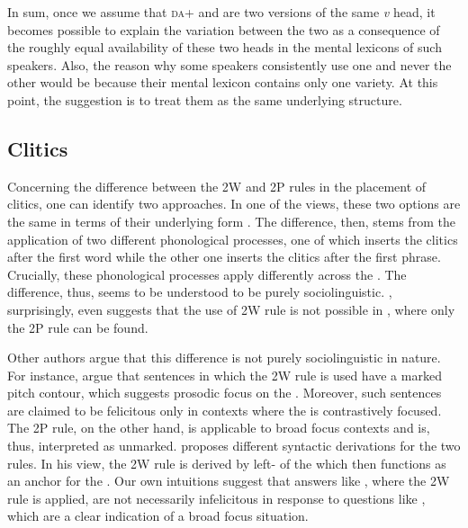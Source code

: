 \documentclass[output=paper,modfonts,newtxmath,hidelinks,]{langscibook}
\begin{document}
\noindent In sum, once we assume that \textsc{da}+ and  are two versions of the same \textit{v} head, it becomes possible to explain the variation between the two as a consequence of the roughly equal availability of these two heads in the mental lexicons of such speakers. Also, the reason why some speakers consistently use one and never the other would be because their mental lexicon contains only one variety. At this point, the suggestion is to treat them as the same underlying structure.

\subsection{Clitics}\label{7:s4.2}

Concerning the difference between the 2W and 2P rules in the placement of cli\-tics, one can identify two approaches. In one of the views, these two options are the same in terms of their underlying form \citep{Ronelle2006,Ronelle2008,Yu2008}. The difference, then, stems from the application of two different phonological processes, one of which inserts the clitics after the first word while the other one inserts the clitics after the first phrase. Crucially, these phonological processes apply differently across the . The difference, thus, seems to be understood to be purely sociolinguistic. \citet{Anderson2005}, surprisingly, even suggests that the use of 2W rule is not possible in , where only the 2P rule can be found.

Other authors argue that this difference is not purely sociolinguistic in nature. For instance, \citet{DiesingEtAl2009} argue that sentences in which the 2W rule is used have a marked pitch contour, which suggests prosodic focus on the . Moreover, such sentences are claimed to be felicitous only in contexts where the  is contrastively focused. The 2P rule, on the other hand, is applicable to broad focus contexts and is, thus, interpreted as unmarked. \citet{Boskovic2009} proposes different syntactic derivations for the two rules. In his view, the 2W rule is derived by left- of the  which then functions as an anchor for the . Our own intuitions suggest that answers like , where the 2W rule is applied, are not necessarily infelicitous in response to questions like , which are a clear indication of a broad focus situation.
\end{document}
